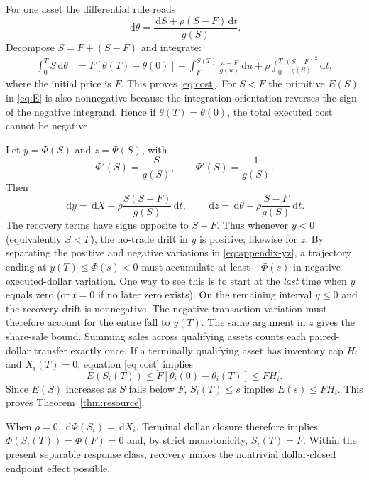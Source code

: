 \documentclass[11pt]{article}
\numberwithin{equation}{section}
\theoremstyle{definition}
\theoremstyle{remark}
\newcommand{\dd}{\,\mathrm{d}}
\begin{document}
For one asset the differential rule reads
\begin{equation}\label{eq:appendix-s}
\dd\theta=\frac{\dd S+\rho(S-F)\dd t}{g(S)}.
\end{equation}
Decompose $S=F+(S-F)$ and integrate:
\begin{align*}
\int_0^T S\dd\theta
&=F[\theta(T)-\theta(0)]
+\int_F^{S(T)}\frac{u-F}{g(u)}\dd u
+\rho\int_0^T\frac{(S-F)^2}{g(S)}\dd t,
\end{align*}
where the initial price is $F$. This proves \eqref{eq:cost}. For $S<F$ the primitive $E(S)$ in \eqref{eq:E} is also nonnegative because the integration orientation reverses the sign of the negative integrand. Hence if $\theta(T)=\theta(0)$, the total executed cost cannot be negative.

Let $y=\Phi(S)$ and $z=\Psi(S)$, with
\[
\Phi'(S)=\frac{S}{g(S)},\qquad \Psi'(S)=\frac1{g(S)}.
\]
Then
\begin{equation}\label{eq:appendix-yz}
\dd y=\dd X-\rho\frac{S(S-F)}{g(S)}\dd t,
\qquad
\dd z=\dd\theta-\rho\frac{S-F}{g(S)}\dd t.
\end{equation}
The recovery terms have signs opposite to $S-F$. Thus whenever $y<0$ (equivalently $S<F$), the no-trade drift in $y$ is positive; likewise for $z$. By separating the positive and negative variations in \eqref{eq:appendix-yz}, a trajectory ending at $y(T)\le\Phi(s)<0$ must accumulate at least $-\Phi(s)$ in negative executed-dollar variation. One way to see this is to start at the \emph{last} time when $y$ equals zero (or $t=0$ if no later zero exists). On the remaining interval $y\le0$ and the recovery drift is nonnegative. The negative transaction variation must therefore account for the entire fall to $y(T)$. The same argument in $z$ gives the share-sale bound. Summing sales across qualifying assets counts each paired-dollar transfer exactly once. If a terminally qualifying asset has inventory cap $H_i$ and $X_i(T)=0$, equation \eqref{eq:cost} implies
\[
E(S_i(T))\le F\left[\theta_i(0)-\theta_i(T)\right]\le FH_i.
\]
Since $E(S)$ increases as $S$ falls below $F$, $S_i(T)\le s$ implies $E(s)\le FH_i$. This proves Theorem~\ref{thm:resource}.

When $\rho=0$, $\dd\Phi(S_i)=\dd X_i$. Terminal dollar closure therefore implies $\Phi(S_i(T))=\Phi(F)=0$ and, by strict monotonicity, $S_i(T)=F$. Within the present separable response class, recovery makes the nontrivial dollar-closed endpoint effect possible.
\end{document}
